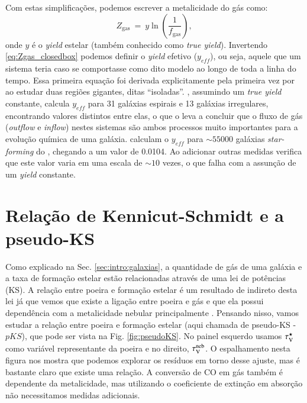 Com estas simplificações, podemos escrever a metalicidade do gás como:
\begin{equation}
	Z_{\mathrm{gas}}\ =\ y \ln \left(\frac{1}{f_{\mathrm{gas}}}\right),
	\label{eq:Zgas_closedbox}
\end{equation}
\noindent onde $y$ é o {\em yield} estelar (também conhecido como {\em true yield}). Invertendo
\eqref{eq:Zgas_closedbox} podemos definir o {\em yield} efetivo ($y_{eff}$), ou seja, aquele que um
sistema teria caso se comportasse como dito modelo ao longo de toda a linha do tempo. Essa primeira
equação foi derivada explicitamente pela primeira vez por \citet{Searle.Sargent.1972a} ao estudar
duas regiões \Hii gigantes, ditas ``isoladas''. \citet{Garnett.2002a}, assumindo um {\em true yield}
constante, calcula $y_{eff}$ para 31 galáxias espirais e 13 galáxias irregulares, encontrando
valores distintos entre elas, o que o leva a concluir que o fluxo de gás ({\em outflow} e {\em
inflow}) nestes sistemas são ambos processos muito importantes para a evolução química de uma
galáxia. \citet{Tremonti.etal.2004a} calculam o $y_{eff}$ para $\sim 55000$ galáxias {\em
star-forming} do \SDSS, chegando a um valor de 0.0104. Ao adicionar outras medidas verifica que
este valor varia em uma escala de $\sim 10$ vezes, o que falha com a assunção de um {\em yield}
constante.

\section{Relação de Kennicut-Schmidt e a pseudo-KS}
\label{sec:gasfrac:KS}

Como explicado na Sec. \ref{sec:intro:galaxias}, a quantidade de gás de uma galáxia e a taxa de
formação estelar estão relacionadas através de uma lei de potências (KS). A relação entre poeira e
formação estelar é um resultado de indireto desta lei já que vemos que existe a ligação entre poeira
e gás e que ela possui dependência com a metalicidade nebular principalmente \citep[][e suas
referências]{Magdis.etal.2011a, Leroy.etal.2011a, Santini.etal.2014a}. Pensando nisso, vamos estudar
a relação entre poeira e formação estelar (aqui chamada de pseudo-KS - $pKS$), que pode ser vista na
Fig. \ref{fig:pseudoKS}. No painel esquerdo usamos $\tau_{\mathrm{V}}^\star$ como variável representante da poeira e
no direito, $\tau_{\mathrm{V}}^{\mathrm{neb}}$. O espalhamento nesta figura nos mostra que podemos explorar os resíduos em
torno desse ajuste, mas é bastante claro que existe uma relação. A conversão de CO em gás também é
dependente da metalicidade, mas utilizando o coeficiente de extinção em absorção não necessitamos
medidas adicionais.

